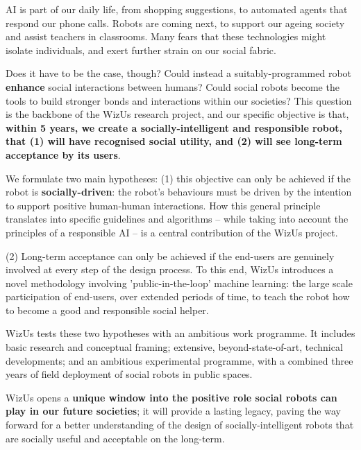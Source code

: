 \documentclass[11pt,a4paper]{report}
\newcommand{\project}{WizUs\xspace}
\begin{document}
AI is part of our daily life, from shopping suggestions, to automated agents
that respond our phone calls. Robots are coming next, to support our ageing
society and assist teachers in classrooms. Many fears that these technologies
might isolate individuals, and exert further strain on our social fabric.

Does it have to be the case, though? Could instead a suitably-programmed robot
\textbf{enhance} social interactions between humans? Could social robots become
the tools to build stronger bonds and interactions within our societies? This
question is the backbone of the \project research project, and our specific
objective is that, \textbf{within 5 years, we create a socially-intelligent and
responsible robot, that (1) will have recognised social utility, and (2) will
see long-term acceptance by its users}.

We formulate two main hypotheses: (1) this objective can only be achieved if the
robot is \textbf{socially-driven}: the robot's behaviours must be driven by the
intention to support positive human-human interactions. How this general
principle translates into specific guidelines and algorithms -- while taking into
account the principles of a responsible AI -- is a central
contribution of the \project project.

(2) Long-term acceptance can only be achieved if the end-users are genuinely
involved at every step of the design process. To this end, \project introduces a novel
methodology involving 'public-in-the-loop' machine learning: the large scale
participation of end-users, over extended periods of time, to teach the robot how to
become a good and responsible social helper.

\project tests these two hypotheses with an ambitious work programme. It
includes basic research and conceptual framing; extensive, beyond-state-of-art, technical
developments; and an ambitious experimental programme, with a combined three years
of field deployment of social robots in public spaces.

\project opens a \textbf{unique window into the positive role social robots can
play in our future societies}; it will provide a lasting legacy, paving the way
forward for a better understanding of the design of socially-intelligent robots
that are socially useful and acceptable on the long-term.

\newpage


\pagebreak
\end{document}
